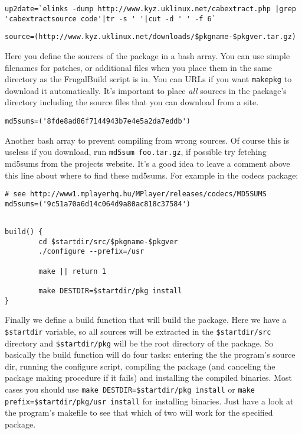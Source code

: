 \begin{verbatim}
up2date=`elinks -dump http://www.kyz.uklinux.net/cabextract.php |grep 'cabextractsource code'|tr -s ' '|cut -d ' ' -f 6`
\end{verbatim}

\begin{verbatim}
source=(http://www.kyz.uklinux.net/downloads/$pkgname-$pkgver.tar.gz)
\end{verbatim}

Here you define the sources of the package in a bash array. You can use simple filenames for patches, or additional files when you place them in the same directory as the FrugalBuild script is in. You can URLs if you want {\tt makepkg} to download it automatically. It's important to place \textit{all} sources in the package's directory including the source files that you can download from a site.

\begin{verbatim}
md5sums=('8fde8ad86f7144943b7e4e5a2da7eddb')
\end{verbatim}

Another bash array to prevent compiling from wrong sources. Of course this is useless if you download, run {\tt md5sum foo.tar.gz}, if possible try fetching md5sums from the projects website. It's a good idea to leave a comment above this line about where to find these md5sums. For example in the codecs package:

\begin{verbatim}
# see http://www1.mplayerhq.hu/MPlayer/releases/codecs/MD5SUMS
md5sums=('9c51a70a6d14c064d9a80ac818c37584')
\end{verbatim}

\begin{verbatim}

build() {
        cd $startdir/src/$pkgname-$pkgver
        ./configure --prefix=/usr
	
        make || return 1
	
        make DESTDIR=$startdir/pkg install
}
\end{verbatim}

Finally we define a build function that will build the package. Here we have a {\tt \$startdir} variable, so all sources will be extracted in the {\tt \$startdir/src} directory and {\tt \$startdir/pkg} will be the root directory of the package. So basically the build function will do four tasks: entering the the program's source dir, running the configure script, compiling the package (and canceling the package making procedure if it fails) and installing the compiled binaries. Most cases you should use {\tt make DESTDIR=\$startdir/pkg install} or {\tt make prefix=\$startdir/pkg/usr install} for installing binaries. Just have a look at the program's makefile to see that which of two will work for the specified package.

